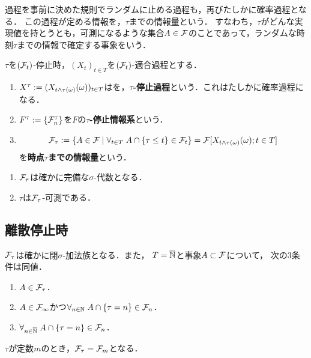 \documentclass[uplatex,dvipdfmx]{jsreport}
\begin{document}
\begin{tcolorbox}[colframe=ForestGreen, colback=ForestGreen!10!white,breakable,colbacktitle=ForestGreen!40!white,coltitle=black,fonttitle=\bfseries\sffamily,
title=]
    過程を事前に決めた規則でランダムに止める過程も，再びたしかに確率過程となる．
    この過程が定める情報を，$\tau$までの情報量という．
    すなわち，$\tau$がどんな実現値を持とうとも，可測になるような集合$A\in\mathcal{F}$のことであって，ランダムな時刻$\tau$までの情報で確定する事象をいう．
\end{tcolorbox}

\begin{definition}
    $\tau$を$(\mathcal{F}_t)$-停止時，$(X_t)_{t\in T}$を$(\mathcal{F}_t)$-適合過程とする．
    \begin{enumerate}
        \item $X^\tau:=(X_{t\land\tau(\omega)}(\omega))_{t\in T}$はを，\textbf{$\tau$-停止過程}という．これはたしかに確率過程になる．
        \item $F^\tau:=\{\mathcal{F}_n^\tau\}$を$F$の\textbf{$\tau$-停止情報系}という．
        \item \[\mathcal{F}_\tau:=\left\{A\in\mathcal{F}\mid\forall_{t\in T}\;A\cap\left\{\tau\le t\right\}\in\mathcal{F}_t\right\}=\mathcal{F}[X_{t\land\tau(\omega)}(\omega);t\in T]\]
        を\textbf{時点$\tau$までの情報量}という．
    \end{enumerate}
\end{definition}

\begin{lemma}\mbox{}
    \begin{enumerate}
        \item $\mathcal{F}_\tau$は確かに完備な$\sigma$-代数となる．
        \item $\tau$は$\mathcal{F}_\tau$-可測である．
    \end{enumerate}
\end{lemma}

\subsection{離散停止時}

\begin{lemma}[離散停止時の情報の特徴付け]
    $\mathcal{F}_\tau$は確かに閉$\sigma$-加法族となる．また，
    $T=\overline{\mathbb{N}}$と事象$A\subset\mathcal{F}$について，
    次の3条件は同値．
    \begin{enumerate}
        \item $A\in\mathcal{F}_\tau$．
        \item $A\in\mathcal{F}_\infty$かつ$\forall_{n\in\mathbb{N}}\;A\cap\{\tau=n\}\in\mathcal{F}_n$．
        \item $\forall_{n\in\overline{\mathbb{N}}}\;A\cap\{\tau=n\}\in\mathcal{F}_n$．
    \end{enumerate}
\end{lemma}
\begin{example}
    $\tau$が定数$m$のとき，$\mathcal{F}_\tau=\mathcal{F}_m$となる．
\end{example}
\end{document}
